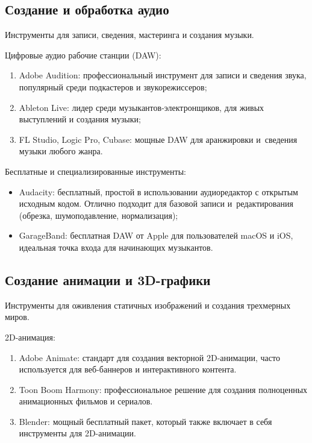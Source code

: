 \documentclass{ou}
\begin{document}
\subsection{Создание и обработка аудио}
Инструменты для записи, сведения, мастеринга и создания музыки.

Цифровые аудио рабочие станции (DAW):
\begin{enumerate}[leftmargin=0em, itemindent=3.75em, nosep, label=\arabic*)]
\item Adobe Audition: профессиональный инструмент для записи и сведения звука, популярный среди подкастеров и звукорежиссеров;
\item Ableton Live: лидер среди музыкантов-электронщиков, для живых выступлений и создания музыки;
\item FL Studio, Logic Pro, Cubase: мощные DAW для аранжировки и~сведения музыки любого жанра.
\end{enumerate}

Бесплатные и специализированные инструменты:
\begin{itemize}[label=-, leftmargin=0em, itemindent=3.35em, nosep]
\item Audacity: бесплатный, простой в использовании аудиоредактор с открытым исходным кодом. Отлично подходит для базовой записи и~редактирования (обрезка, шумоподавление, нормализация);
\item GarageBand: бесплатная DAW от Apple для пользователей macOS и iOS, идеальная точка входа для начинающих музыкантов.
\end{itemize}
\subsection{Создание анимации и 3D-графики}
Инструменты для оживления статичных изображений и создания трехмерных миров.

2D-анимация:
\begin{enumerate}[leftmargin=0em, itemindent=3.75em, nosep, label=\arabic*)]
\item Adobe Animate: стандарт для создания векторной 2D-анимации, часто используется для веб-баннеров и интерактивного контента.
\item Toon Boom Harmony: профессиональное решение для создания полноценных анимационных фильмов и сериалов.
\item Blender: мощный бесплатный пакет, который также включает в себя инструменты для 2D-анимации.
\end{enumerate}
\end{document}
